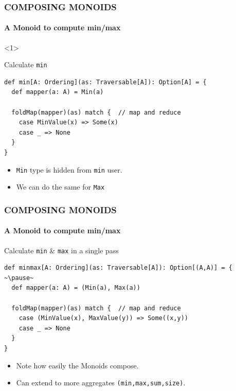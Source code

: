 \documentclass{beamer}
\begin{document}
\begin{frame}[fragile] \frametitle{COMPOSING MONOIDS}
  \framesubtitle{A Monoid to compute min/max}

  \begin{onlyenv}<1>
  \begin{block}{Calculate \texttt{min}}
  \begin{lstlisting}
def min[A: Ordering](as: Traversable[A]): Option[A] = {
  def mapper(a: A) = Min(a)

  foldMap(mapper)(as) match {  // map and reduce
    case MinValue(x) => Some(x)
    case _ => None
  }
}
  \end{lstlisting}
  \end{block}
  \end{onlyenv}

  \begin{itemize}
    \item \texttt{Min} type is hidden from \texttt{min} user.
    \item We can do the same for \texttt{Max}
  \end{itemize}
\end{frame}


\begin{frame}[fragile] \frametitle{COMPOSING MONOIDS}
  \framesubtitle{A Monoid to compute min/max}
  \begin{block}{Calculate \texttt{min} \& \texttt{max} in a \alert{single pass}}
  \begin{lstlisting}
def minmax[A: Ordering](as: Traversable[A]): Option[(A,A)] = { ~\pause~
  def mapper(a: A) = (Min(a), Max(a))

  foldMap(mapper)(as) match {  // map and reduce
    case (MinValue(x), MaxValue(y)) => Some((x,y))
    case _ => None
  }
}
  \end{lstlisting}
  \end{block}

  \begin{itemize}
    \item Note how easily the Monoids \alert{compose}.
    \item Can extend to more \alert{aggregates} \texttt{(min,max,sum,size)}.
  \end{itemize}
\end{frame}

\end{document}
